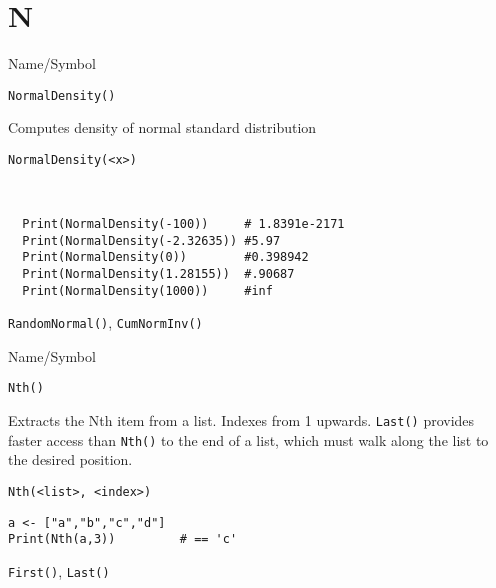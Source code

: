 \rl
\section{N}
\rl

\begin{desc}{Name/Symbol}
\item[Name/Symbol]	\verb+NormalDensity()+

\item[Description]	Computes density of normal standard distribution
\item[Usage]
\begin{verbatim}
NormalDensity(<x>)
\end{verbatim}

\item[Example]	
\begin{verbatim}


  Print(NormalDensity(-100))     # 1.8391e-2171
  Print(NormalDensity(-2.32635)) #5.97
  Print(NormalDensity(0))        #0.398942
  Print(NormalDensity(1.28155))  #.90687
  Print(NormalDensity(1000))     #inf

\end{verbatim}

\item[See Also]	\verb+RandomNormal()+, \verb+CumNormInv()+ 
\end{desc}

\rl




\begin{desc}{Name/Symbol}
\item[Name/Symbol]	\verb+Nth()+

\item[Description]	Extracts the Nth item from a list.  Indexes from 1 upwards.
		\verb+Last()+ provides faster access than \verb+Nth()+ to the end of a list, 
		which must walk along the list to the desired position.

\item[Usage]
\begin{verbatim}
Nth(<list>, <index>)
\end{verbatim}

\item[Example]	
\begin{verbatim}
a <- ["a","b","c","d"]
Print(Nth(a,3)) 		# == 'c'
\end{verbatim}

\item[See Also]	\verb+First()+, \verb+Last()+ 
\end{desc}

